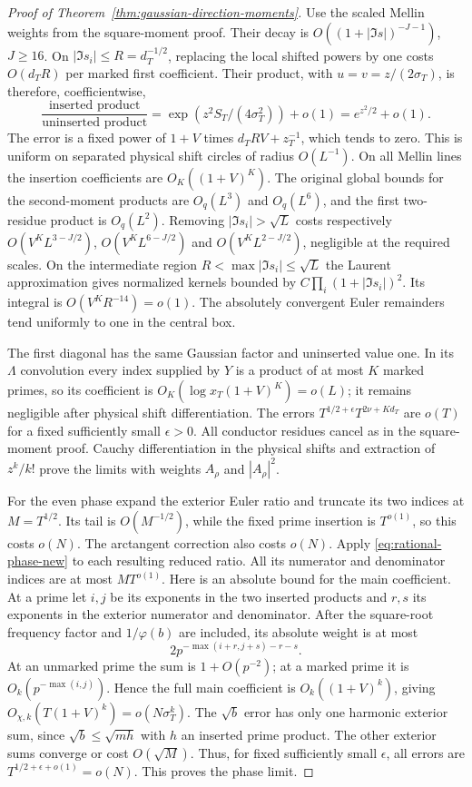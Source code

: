 \begin{proof}[Proof of Theorem~\ref{thm:gaussian-direction-moments}]
Use the scaled Mellin weights from the square-moment proof. Their
decay is $O((1+|\Im s|)^{-J-1})$, $J\ge16$.
On $|\Im s_i|\le R=d_T^{-1/2}$, replacing the local shifted powers
by one costs $O(d_TR)$ per marked first coefficient. Their product,
with $u=v=z/(2\sigma_T)$, is therefore, coefficientwise,
\[
 \frac{\text{inserted product}}{\text{uninserted product}}
    =\exp(z^2S_T/(4\sigma_T^2))+o(1)=e^{z^2/2}+o(1).
\]
The error is a fixed power of $1+V$ times
$d_TRV+z_T^{-1}$, which tends to zero. This is uniform on separated
physical shift circles of radius $O(L^{-1})$.
On all Mellin lines the insertion coefficients are $O_K((1+V)^K)$.
The original global bounds for the second-moment products are
$O_q(L^3)$ and $O_q(L^6)$, and the first two-residue product is
$O_q(L^2)$. Removing $|\Im s_i|>\sqrt L$ costs respectively
$O(V^KL^{3-J/2})$, $O(V^KL^{6-J/2})$ and
$O(V^KL^{2-J/2})$, negligible at the required scales.
On the intermediate region $R<\max|\Im s_i|\le\sqrt L$ the Laurent
approximation gives normalized kernels bounded by
$C\prod_i(1+|\Im s_i|)^2$. Its integral is
$O(V^KR^{-14})=o(1)$. The absolutely convergent Euler remainders
tend uniformly to one in the central box.

The first diagonal has the same Gaussian factor and uninserted value
one. In its $\Lambda$ convolution every index supplied by $Y$ is a
product of at most $K$ marked primes, so its coefficient is
$O_K(\log x_T(1+V)^K)=o(L)$; it remains negligible after physical
shift differentiation. The errors $T^{1/2+\epsilon}T^{2\nu+Kd_T}$
are $o(T)$ for a fixed sufficiently small $\epsilon>0$.
All conductor residues cancel as in the square-moment proof.
Cauchy differentiation in the physical shifts and extraction of
$z^k/k!$ prove the limits with weights $A_\rho$ and $|A_\rho|^2$.

For the even phase expand the exterior Euler ratio and truncate its
two indices at $M=T^{1/2}$. Its tail is $O(M^{-1/2})$, while the
fixed prime insertion is $T^{o(1)}$, so this costs $o(N)$.
The arctangent correction also costs $o(N)$.
Apply \eqref{eq:rational-phase-new} to each resulting reduced ratio.
All its numerator and denominator indices are at most $MT^{o(1)}$.
Here is an absolute bound for the main coefficient. At a prime let
$i,j$ be its exponents in the two inserted products and $r,s$ its
exponents in the exterior numerator and denominator. After the
square-root frequency factor and $1/\varphi(b)$ are included, its
absolute weight is at most
\[
                    2p^{-\max(i+r,j+s)-r-s}.
\]
At an unmarked prime the sum is $1+O(p^{-2})$; at a marked prime
it is $O_k(p^{-\max(i,j)})$. Hence the full main coefficient is
$O_k((1+V)^k)$, giving $O_{\chi,k}(T(1+V)^k)=o(N\sigma_T^k)$.
The $\sqrt b$ error has only one harmonic exterior sum, since
$\sqrt b\le\sqrt{m h}$ with $h$ an inserted prime product.
The other exterior sums converge or cost $O(\sqrt M)$.
Thus, for fixed sufficiently small $\epsilon$, all errors are
$T^{1/2+\epsilon+o(1)}=o(N)$. This proves the phase limit.


\end{proof}
